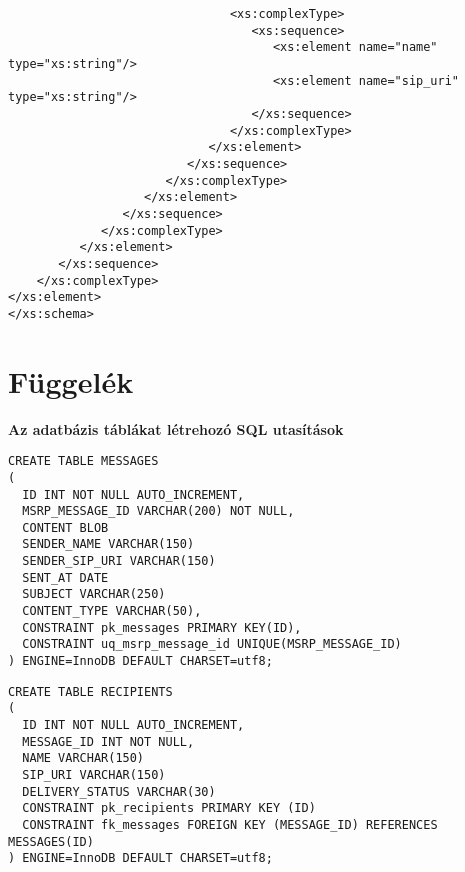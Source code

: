 \begin{verbatim}
                               <xs:complexType>
                                  <xs:sequence>
                                     <xs:element name="name" type="xs:string"/>
                                     <xs:element name="sip_uri" type="xs:string"/>
                                  </xs:sequence>
                               </xs:complexType>
                            </xs:element>
                         </xs:sequence>                    
                      </xs:complexType>                
                   </xs:element>            
                </xs:sequence>
             </xs:complexType>
          </xs:element>            
       </xs:sequence>
    </xs:complexType>
</xs:element>
</xs:schema>
\end{verbatim}
\fontsize{12}{12} 


\section{Függelék}
\label{sec:sql_utasitasok_fuggelek}

\noindent
{\bf Az adatbázis táblákat létrehozó SQL utasítások}

\fontsize{10}{10}
\begin{verbatim}
CREATE TABLE MESSAGES
(
  ID INT NOT NULL AUTO_INCREMENT,
  MSRP_MESSAGE_ID VARCHAR(200) NOT NULL,
  CONTENT BLOB
  SENDER_NAME VARCHAR(150)
  SENDER_SIP_URI VARCHAR(150)
  SENT_AT DATE
  SUBJECT VARCHAR(250)
  CONTENT_TYPE VARCHAR(50),
  CONSTRAINT pk_messages PRIMARY KEY(ID),
  CONSTRAINT uq_msrp_message_id UNIQUE(MSRP_MESSAGE_ID)
) ENGINE=InnoDB DEFAULT CHARSET=utf8;
\end{verbatim}
\fontsize{12}{12}

\fontsize{10}{10}
\begin{verbatim}
CREATE TABLE RECIPIENTS
(
  ID INT NOT NULL AUTO_INCREMENT,
  MESSAGE_ID INT NOT NULL,
  NAME VARCHAR(150)
  SIP_URI VARCHAR(150)
  DELIVERY_STATUS VARCHAR(30)
  CONSTRAINT pk_recipients PRIMARY KEY (ID)
  CONSTRAINT fk_messages FOREIGN KEY (MESSAGE_ID) REFERENCES MESSAGES(ID)
) ENGINE=InnoDB DEFAULT CHARSET=utf8;
\end{verbatim}
\fontsize{12}{12}



